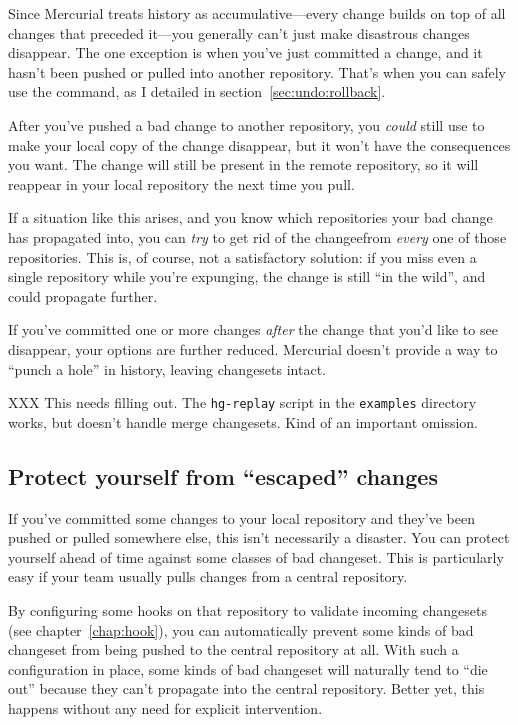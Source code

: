 Since Mercurial treats history as accumulative---every change builds
on top of all changes that preceded it---you generally can't just make
disastrous changes disappear.  The one exception is when you've just
committed a change, and it hasn't been pushed or pulled into another
repository.  That's when you can safely use the 
command, as I detailed in section~\ref{sec:undo:rollback}.

After you've pushed a bad change to another repository, you
\emph{could} still use  to make your local copy of the
change disappear, but it won't have the consequences you want.  The
change will still be present in the remote repository, so it will
reappear in your local repository the next time you pull.

If a situation like this arises, and you know which repositories your
bad change has propagated into, you can \emph{try} to get rid of the
changeefrom \emph{every} one of those repositories.  This is, of
course, not a satisfactory solution: if you miss even a single
repository while you're expunging, the change is still ``in the
wild'', and could propagate further.

If you've committed one or more changes \emph{after} the change that
you'd like to see disappear, your options are further reduced.
Mercurial doesn't provide a way to ``punch a hole'' in history,
leaving changesets intact.

XXX This needs filling out.  The \texttt{hg-replay} script in the
\texttt{examples} directory works, but doesn't handle merge
changesets.  Kind of an important omission.

\subsection{Protect yourself from ``escaped'' changes}

If you've committed some changes to your local repository and they've
been pushed or pulled somewhere else, this isn't necessarily a
disaster.  You can protect yourself ahead of time against some classes
of bad changeset.  This is particularly easy if your team usually
pulls changes from a central repository.

By configuring some hooks on that repository to validate incoming
changesets (see chapter~\ref{chap:hook}), you can automatically
prevent some kinds of bad changeset from being pushed to the central
repository at all.  With such a configuration in place, some kinds of
bad changeset will naturally tend to ``die out'' because they can't
propagate into the central repository.  Better yet, this happens
without any need for explicit intervention.

